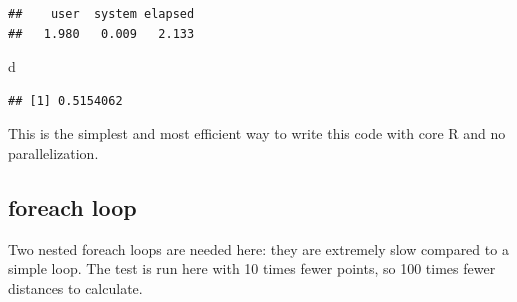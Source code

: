\documentclass[
  12pt,
  american,
  a4paper,
  extrafontsizes,onecolumn,openright
  ]{memoir}
\newenvironment{Shaded}{\begin{snugshade}}{\end{snugshade}}
\newcommand{\AttributeTok}[1]{\textcolor[rgb]{0.77,0.63,0.00}{#1}}
\newcommand{\ControlFlowTok}[1]{\textcolor[rgb]{0.13,0.29,0.53}{\textbf{#1}}}
\newcommand{\DecValTok}[1]{\textcolor[rgb]{0.00,0.00,0.81}{#1}}
\newcommand{\FunctionTok}[1]{\textcolor[rgb]{0.00,0.00,0.00}{#1}}
\newcommand{\NormalTok}[1]{#1}
\newcommand{\OtherTok}[1]{\textcolor[rgb]{0.56,0.35,0.01}{#1}}
\newcommand{\SpecialCharTok}[1]{\textcolor[rgb]{0.00,0.00,0.00}{#1}}
\newcommand{\StringTok}[1]{\textcolor[rgb]{0.31,0.60,0.02}{#1}}
\begin{document}
\begin{verbatim}
##    user  system elapsed 
##   1.980   0.009   2.133
\end{verbatim}

\begin{Shaded}
\begin{Highlighting}[]
\NormalTok{d}
\end{Highlighting}
\end{Shaded}

\begin{verbatim}
## [1] 0.5154062
\end{verbatim}

\normalsize

This is the simplest and most efficient way to write this code with core R and no parallelization.

\hypertarget{foreach-loop}{%
\subsection{foreach loop}\label{foreach-loop}}

Two nested foreach loops are needed here: they are extremely slow compared to a simple loop.
The test is run here with 10 times fewer points, so 100 times fewer distances to calculate.

\scriptsize

\begin{Shaded}
\end{Shaded}
\end{document}
